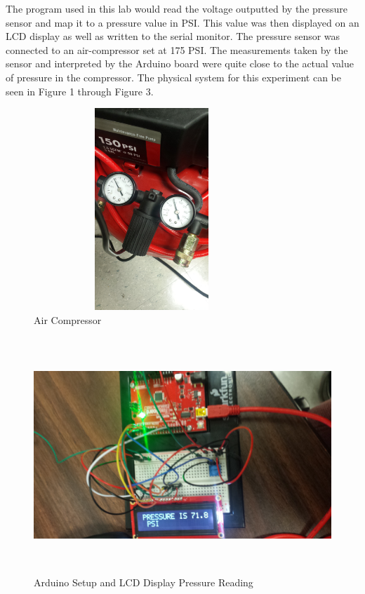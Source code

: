 \documentclass[12pt]{article}
\begin{document}
The program used in this lab would read the voltage outputted by the pressure sensor and map it to a pressure value in PSI. This value was then displayed on an LCD display as well as written to the serial monitor. The pressure sensor was connected to an air-compressor set at 175 PSI. The measurements taken by the sensor and interpreted by the Arduino board were quite close to the actual value of pressure in the compressor. The physical system for this experiment can be seen in Figure 1 through Figure 3.
\bigskip

 
 \begin{figure}[h!] %
    \centering
    \includegraphics[width=3.5in, height= 3in, angle=-90]{air_compressor.jpg} 
    \caption{Air Compressor}
    \label{fig:example}
 \end{figure}
  
 \newpage

\begin{figure}[h!] %
    \centering
    \includegraphics[width=6in, height=3.5in]{arduino_pressure_reading.jpg} 
    \caption{Arduino Setup and LCD Display Pressure Reading}
    \label{fig:example}
 \end{figure}
\end{document}
